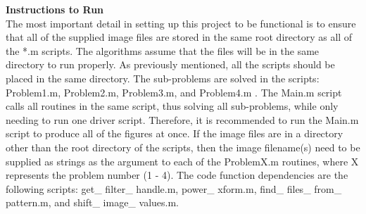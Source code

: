 \documentclass[./rarnold_report3.tex]{subfiles}
\begin{document}
\noindent \textbf{Instructions to Run} \\

\noindent The most important detail in setting up this project to be functional is to ensure that all of the supplied image files are stored in the same root directory as all of the *.m scripts.  The algorithms assume that the files will be in the same directory to run properly.  As previously mentioned, all the scripts should be placed in the same directory.  The sub-problems are solved in the scripts: Problem1.m, Problem2.m, Problem3.m, and Problem4.m .  The Main.m script calls all routines in the same script, thus solving all sub-problems, while only needing to run one driver script.  Therefore, it is recommended to run the Main.m script to produce all of the figures at once.  If the image files are in a directory other than the root directory of the scripts, then the image filename(s) need to be supplied as strings as the argument to each of the ProblemX.m routines, where X represents the problem number (1 - 4).  The code function dependencies are the following scripts: get\_ filter\_ handle.m, power\_ xform.m, find\_ files\_ from\_ pattern.m, and shift\_ image\_ values.m.
\end{document}
